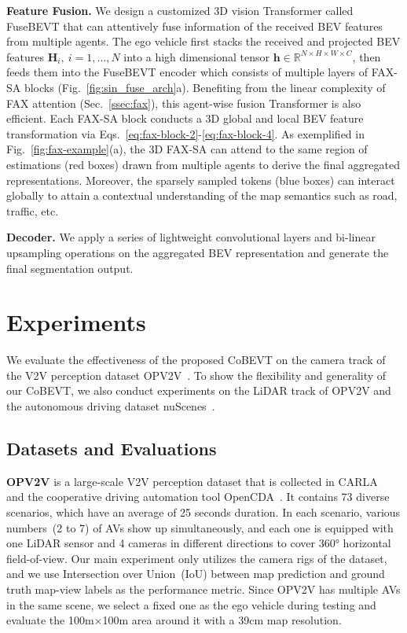 \documentclass{article}
\begin{document}
\textbf{Feature Fusion.} We design a customized 3D vision Transformer called FuseBEVT that can attentively fuse information of the received BEV features from multiple agents.  
%
The ego vehicle first stacks the received and projected BEV features $\mathbf{H}_i,\ i=1,...,N$ into a high dimensional tensor $\mathbf{h}\in \mathbb{R}^{N\times H\times W\times C}$, then feeds them into the FuseBEVT encoder which consists of multiple layers of FAX-SA blocks (Fig.~\ref{fig:sin_fuse_arch}a). Benefiting from the linear complexity of FAX attention (Sec.~\ref{ssec:fax}), this agent-wise fusion Transformer is also efficient.
%
Each FAX-SA block conducts a 3D global and local BEV feature transformation via Eqs.~\ref{eq:fax-block-2}-\ref{eq:fax-block-4}.
%
As exemplified in Fig.~\ref{fig:fax-example}(a), the 3D FAX-SA can attend to the same region of estimations (red boxes) drawn from multiple agents to derive the final aggregated representations.
%
Moreover, the sparsely sampled tokens (blue boxes) can interact globally to attain a contextual understanding of the map semantics such as road, traffic, etc.

\textbf{Decoder.} We apply a series of lightweight convolutional layers and bi-linear upsampling operations on the aggregated BEV representation and generate the final segmentation output.



\section{Experiments}
We evaluate the effectiveness of the proposed CoBEVT on the camera track of the V2V perception dataset OPV2V~\cite{xu2021opv2v}. To show the flexibility and generality of our CoBEVT, we also conduct experiments on the LiDAR track of OPV2V and the autonomous driving dataset nuScenes~\cite{caesar2020nuscenes}. 

\label{sec:result}
\subsection{Datasets and Evaluations}
\noindent\textbf{OPV2V} is a large-scale V2V perception dataset that is collected in CARLA~\cite{Dosovitskiy17} and the cooperative driving automation tool OpenCDA~\cite{xu2021opencda}. 
%
It contains 73 diverse scenarios, which have an average of 25 seconds duration.
%
In each scenario, various numbers~(2 to 7) of AVs show up simultaneously, and each one is equipped with one LiDAR sensor and 4 cameras in different  directions to cover 360° horizontal field-of-view.
%
%
Our main experiment only utilizes the camera rigs of the dataset, and we use Intersection over Union~(IoU) between map prediction and ground truth map-view labels as the performance metric. 
%
Since OPV2V has multiple AVs in the same scene, we select a fixed one as the ego vehicle during testing and evaluate the 100m×100m area around it with a 39cm map resolution.
\end{document}
